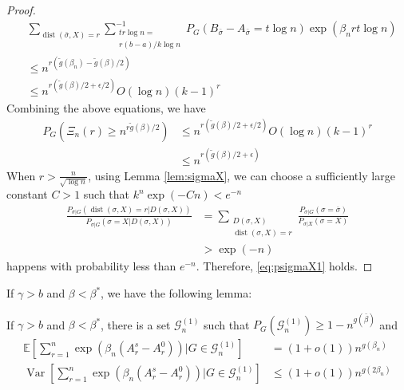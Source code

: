 \documentclass[entropy,article,submit,moreauthors,pdftex]{Definitions/mdpi}
\newcommand{\cG}{\mathcal{G}}
\newcommand{\1}{\mathbbm{1}}
\DeclareMathOperator{\Var}{Var}
\DeclareMathOperator{\Dist}{dist}
\begin{document}
\begin{proof}
\begin{align*}
&\sum_{\Dist(\bar{\sigma}, X) = r}\sum_{\substack{tr\log n = \\ r(b-a)/k\log n} }^{-1}
P_G(B_{\bar{\sigma}} -A_{\bar{\sigma}}=t\log n)\exp(\beta_n rt \log n) \\
& \leq  n^{r(\tilde{g}(\beta_n) - \tilde{g}(\beta)/2)}\\
& \leq  n^{r(\tilde{g}(\beta)/2 + \epsilon/2)} O(\log n) (k-1)^r
\end{align*}
Combining the above equations, we have
\begin{align*}
P_{G}(\Xi_n(r) \geq n^{r \tilde{g}(\beta) /2}) &\leq  n^{r(\tilde{g}(\beta)/2 + \epsilon/2)} O(\log n) (k-1)^r\\
&\leq n^{r(\tilde{g}(\beta)/2 + \epsilon)}
\end{align*}
When $r>\frac{n}{\sqrt{\log n}}$, using Lemma \ref{lem:sigmaX}, we can choose a sufficiently large constant $C>1$
such that $k^n\exp(-Cn) < e^{-n}$
\begin{align*}
\frac{P_{\sigma|G}(\Dist(\sigma, X)=r | D(\sigma, X))}
{P_{\sigma|G}(\sigma=X | D(\sigma, X))} &= \sum_{\substack{D(\sigma, X) \\ \Dist(\sigma, X)=r}} \frac{P_{\sigma | G}(\sigma = \bar{\sigma}) }{P_{\sigma | X}(\sigma = X)} \\
&> \exp(-n)
\end{align*}
happens with probability less than $e^{-n}$. Therefore, \eqref{eq:psigmaX1} holds.
\end{proof}

If $\gamma > b$ and $\beta < \beta^*$, we have the following lemma:
\begin{Lemma}\label{lem:7}
	If $\gamma > b$ and $\beta < \beta^*$, there is a set $\cG^{(1)}_n$ such that
	$P_G(\cG^{(1)}_n) \geq 1-n^{g(\bar{\beta})}$
	and
	\begin{align}
	\mathbb{E}[\sum_{r=1}^n \exp(\beta_n (A_r^s - A_r^0)) | G \in \cG^{(1)}_n] &= (1+o(1))n^{g(\beta_n)} \\
	\Var[\sum_{r=1}^n \exp(\beta_n (A_r^s - A_r^0)) | G \in \cG^{(1)}_n] &\leq (1+o(1)) n^{g(2\beta_n)} 
	\end{align}
\end{Lemma}
\end{document}
